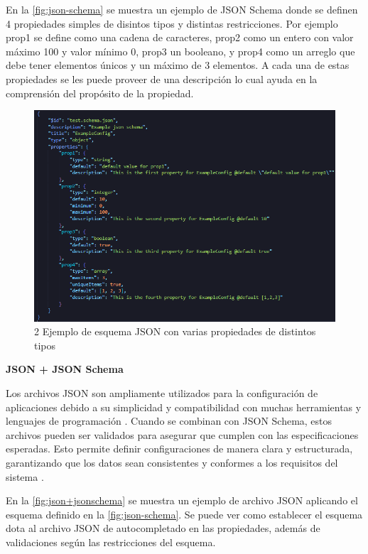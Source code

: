 En la \autoref{fig:json-schema} se muestra un ejemplo de JSON Schema donde se definen 4 propiedades simples de disintos tipos y distintas restricciones. Por ejemplo prop1 se define como una cadena de caracteres, prop2 como un entero con valor máximo 100 y valor mínimo 0, prop3 un booleano, y prop4 como un arreglo que debe tener elementos únicos y un máximo de 3 elementos. A cada una de estas propiedades se les puede proveer de una descripción lo cual ayuda en la comprensión del propósito de la propiedad.

\begin{figure}[h]
    \centering
    \includegraphics[width=\linewidth]{images/json-schema.png}
    \caption{2 Ejemplo de esquema JSON con varias propiedades de distintos tipos}
    \label{fig:json-schema}
\end{figure}

\textbf{JSON + JSON Schema}

Los archivos JSON son ampliamente utilizados para la configuración de aplicaciones debido a su simplicidad y compatibilidad con muchas herramientas y lenguajes de programación \autocite{erickson_what_2024}. Cuando se combinan con JSON Schema, estos archivos pueden ser validados para asegurar que cumplen con las especificaciones esperadas. Esto permite definir configuraciones de manera clara y estructurada, garantizando que los datos sean consistentes y conformes a los requisitos del sistema \autocite{bray_javascript_2014,attouche_witness_2022}.

En la \autoref{fig:json+jsonschema} se muestra un ejemplo de archivo JSON aplicando el esquema definido en la \autoref{fig:json-schema}. Se puede ver como establecer el esquema dota al archivo JSON de autocompletado en las propiedades, además de validaciones según las restricciones del esquema.

